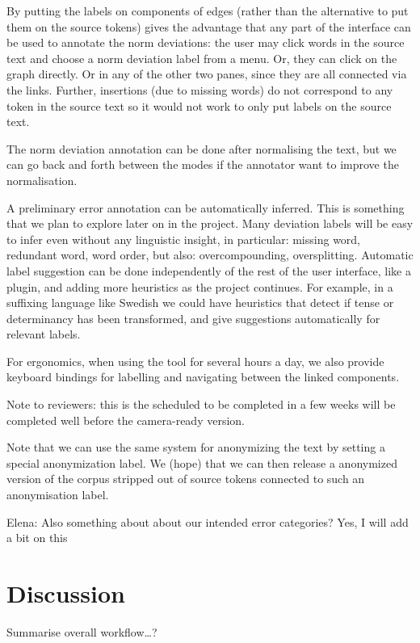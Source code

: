 \documentclass[10pt, a4paper]{article}
\begin{document}
By putting the labels on components of edges
(rather than the alternative to put them on the source tokens)
gives the advantage that any part of the interface
can be used to annotate the norm deviations:
the user may click words in the source text and choose
a norm deviation label from a menu. Or, they can click
on the graph directly. Or in any of the other two panes,
since they are all connected via the links.
Further, insertions (due to missing words) do not correspond to any token
in the source text so it would not work to only put labels on the
source text.

The norm deviation annotation can be done after normalising the text,
but we can go back and forth between the modes if the annotator want to
improve the normalisation.

A preliminary error annotation can be automatically inferred. This is
something that we plan to explore later on in the project.
Many deviation labels will be easy to infer even without any linguistic
insight, in particular: missing word, redundant word, word order, but also:
overcompounding, oversplitting.
Automatic label suggestion can be done independently of the rest of the user interface,
like a plugin, and adding more heuristics as the project continues.
For example, in a suffixing language like Swedish we could have heuristics
that detect if tense or determinancy has been transformed, and give
suggestions automatically for relevant labels.

For ergonomics, when using the tool for several hours a day,
we also provide keyboard bindings for labelling and navigating between
the linked components.

Note to reviewers: this is the scheduled to be completed in a few weeks
will be completed well before the camera-ready version.

Note that we can use the same system for anonymizing the text
by setting a special anonymization label. We (hope) that we can
then release a anonymized version of the corpus stripped out
of source tokens connected to such an anonymisation label.

Elena: Also something about about our intended error categories? Yes, I will add a bit on this

\section{Discussion}
\label{sec:discussion}

Summarise overall workflow\ldots ?
\end{document}
